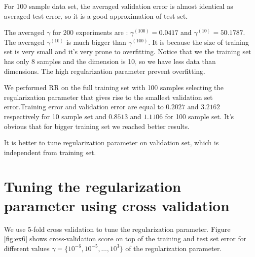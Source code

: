 \documentclass{article} %
\begin{document}
For 100 sample data set, the averaged validation error is almost identical as averaged test error, so it is a good approximation of test set. 

The averaged $\gamma$ for 200 experiments are : $\gamma^{(100)} = 0.0417 $ and  $\gamma^{(10)} = 50.1787$. The averaged  $\gamma^{(10)}$ is much bigger than  $\gamma^{(100)}$. It is because the size of training set is very small and it's very prone to overfitting. Notice that we the training set has only 8 samples and the dimension is 10, so we have less data than dimensions. The high regularization parameter prevent overfitting.

We performed RR on the full training set with 100 samples selecting the regularization parameter that gives rise to the smallest validation set error.Training error and validation error are equal to $0.2027$ and $3.2162$ respectively for 10 sample set and   $0.8513$ and $1.1106$  for 100 sample set. It's obvious that for bigger training set we reached better results.

It is better to tune regularization parameter on validation set, which is independent from training set.

\section{Tuning the regularization parameter using cross validation}
We use 5-fold cross validation to tune the regularization parameter. Figure \ref{fig:ex6} shows cross-validation score on top of the training and test set error for different values $\gamma = \{10^{-6}, 10^{-5}, \dots, 10^3 \}$ of the regularization parameter.
\end{document}
